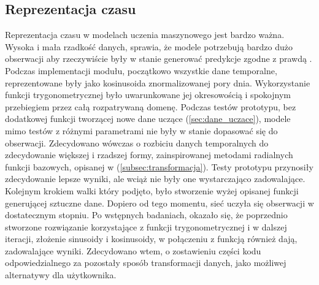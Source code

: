 \subsection{Reprezentacja czasu} \label{subsec:reprezentacja_czasu}
Reprezentacja czasu w modelach uczenia maszynowego jest bardzo ważna. Wysoka i mała rzadkość danych, sprawia, że modele potrzebują bardzo dużo obserwacji aby rzeczywiście były w stanie generować predykcje zgodne z prawdą \cite{curse_of_dimensionality}. Podczas implementacji modułu, początkowo wszystkie dane temporalne, reprezentowane były jako kosinusoida znormalizowanej pory dnia. Wykorzystanie funkcji trygonometrycznej było uwarunkowane jej okresowością i spokojnym przebiegiem przez całą rozpatrywaną domenę. Podczas testów prototypu, bez dodatkowej funkcji tworzącej nowe dane uczące (\ref{sec:dane_uczace}), modele mimo testów z różnymi parametrami nie były w stanie dopasować się do obserwacji. Zdecydowano wówczas o rozbiciu danych temporalnych do zdecydowanie większej i rzadszej formy, zainspirowanej metodami radialnych funkcji bazowych, opisanej w (\ref{subsec:transformacja}). Testy prototypu przynosiły zdecydowanie lepsze wyniki, ale wciąż nie były one wystarczająco zadowalające. Kolejnym krokiem walki który podjęto, było stworzenie wyżej opisanej funkcji generującej sztuczne dane. Dopiero od tego momentu, sieć uczyła się obserwacji w dostatecznym stopniu. Po wstępnych badaniach, okazało się, że poprzednio stworzone rozwiązanie korzystające z funkcji trygonometrycznej i w dalszej iteracji, złożenie sinusoidy i kosinusoidy, w połączeniu z funkcją również dają, zadowalające wyniki. Zdecydowano wtem, o zostawieniu części kodu odpowiedzialnego za pozostały sposób transformacji danych, jako możliwej alternatywy dla użytkownika.


